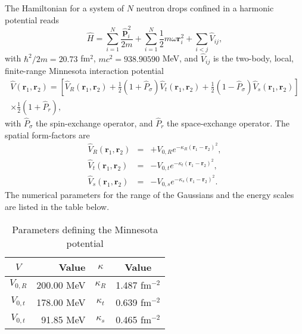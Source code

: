 \documentclass[letterpaper,11pt]{article}
\newcommand{\gras}[1]{\boldsymbol{#1}}
\begin{document}
The Hamiltonian for a system of $N$ neutron drops confined in a harmonic potential reads
\begin{equation}
\hat{H} 
= 
\sum_{i=1}^{N} \frac{\hat{\gras{p}}_{i}^{2}}{2m}
+
\sum_{i=1}^{N} \frac{1}{2} m\omega \gras{r}_{i}^{2}
+
\sum_{i<j} \hat{V}_{ij},
\end{equation}
with $\hbar^{2}/2m = 20.73$ fm$^{2}$, $mc^{2} = 938.90590$ MeV, and $\hat{V}_{ij}$ is the two-body, local, finite-range Minnesota interaction potential
\begin{multline}
\hat{V}(\gras{r}_{1},\gras{r}_{2}) = 
\left[ 
\hat{V}_{R}(\gras{r}_{1},\gras{r}_{2}) 
+ 
\frac{1}{2}\left( 1 + \hat{P}_{\sigma}\right) \hat{V}_{t}(\gras{r}_{1},\gras{r}_{2})
+ 
\frac{1}{2}\left( 1 - \hat{P}_{\sigma}\right) \hat{V}_{s}(\gras{r}_{1},\gras{r}_{2})
\right] \\
\times\frac{1}{2}\left( 1 + \hat{P}_{r}\right),
\end{multline}
with $\hat{P}_{\sigma}$ the spin-exchange operator, and $\hat{P}_{r}$ the space-exchange operator. The spatial form-factors are
\begin{eqnarray}
\hat{V}_{R}(\gras{r}_{1},\gras{r}_{2})  & = & + V_{0,R} e^{-\kappa_{R}(\gras{r}_{1} - \gras{r}_{2})^{2}}, \\
\hat{V}_{t}(\gras{r}_{1},\gras{r}_{2})  & = & - V_{0,t} e^{-\kappa_{t}(\gras{r}_{1} - \gras{r}_{2})^{2}}, \\
\hat{V}_{s}(\gras{r}_{1},\gras{r}_{2})  & = & - V_{0,s} e^{-\kappa_{s}(\gras{r}_{1} - \gras{r}_{2})^{2}}.
\end{eqnarray}
The numerical parameters for the range of the Gaussians and the energy scales are listed in the table below.
\begin{table}[h]
\caption{Parameters defining the Minnesota potential}
\begin{center}
\begin{tabular}{crcc}
$V$ & Value & $\kappa$ & Value \\
\hline
$V_{0,R}$ & 200.00 MeV & $\kappa_{R}$ & 1.487 fm$^{-2}$ \\
$V_{0,t}$ & 178.00 MeV & $\kappa_{t}$ & 0.639 fm$^{-2}$ \\
$V_{0,t}$ &  91.85 MeV & $\kappa_{s}$ & 0.465 fm$^{-2}$ \\
\end{tabular}
\end{center}
\end{table}

\end{document}
